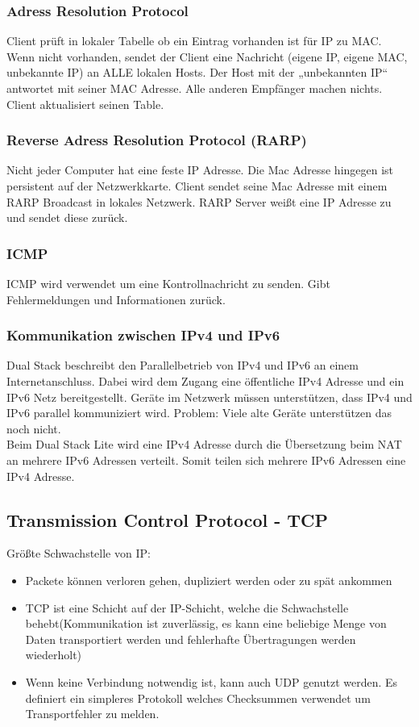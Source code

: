 \documentclass[12pt,a4paper]{article}
\begin{document}
\subsubsection{Adress Resolution Protocol}
Client prüft in lokaler Tabelle ob ein Eintrag vorhanden ist für IP zu MAC. Wenn nicht vorhanden, sendet der Client eine Nachricht (eigene IP, eigene MAC, unbekannte IP) an ALLE lokalen Hosts. Der Host mit der „unbekannten IP“ antwortet mit seiner MAC Adresse. Alle anderen Empfänger machen nichts. Client aktualisiert seinen Table.

\subsubsection{Reverse Adress Resolution Protocol (RARP)}
Nicht jeder Computer hat eine feste IP Adresse. Die Mac Adresse hingegen ist persistent auf der Netzwerkkarte. Client sendet seine Mac Adresse mit einem RARP Broadcast in lokales Netzwerk. RARP Server weißt eine IP Adresse zu und sendet diese zurück.

\subsubsection{ICMP}
ICMP wird verwendet um eine Kontrollnachricht zu senden. Gibt Fehlermeldungen und Informationen zurück.

\subsubsection{Kommunikation zwischen IPv4 und IPv6}
Dual Stack beschreibt den Parallelbetrieb von IPv4 und IPv6 an einem Internetanschluss. Dabei wird dem Zugang eine öffentliche IPv4 Adresse und ein IPv6 Netz bereitgestellt. Geräte im Netzwerk müssen unterstützen, dass IPv4 und IPv6 parallel kommuniziert wird. Problem: Viele alte Geräte unterstützen das noch nicht. \\
Beim Dual Stack Lite wird eine IPv4 Adresse durch die Übersetzung beim NAT an mehrere IPv6 Adressen verteilt. Somit teilen sich mehrere IPv6 Adressen eine IPv4 Adresse.

\subsection{Transmission Control Protocol - TCP}
Größte Schwachstelle von IP:
\begin{itemize}
	\item Packete können verloren gehen, dupliziert werden oder zu spät ankommen
	\item TCP ist eine Schicht auf der IP-Schicht, welche die Schwachstelle behebt(Kommunikation ist zuverlässig, es kann eine beliebige Menge von Daten transportiert werden und fehlerhafte Übertragungen werden wiederholt)
	\item Wenn keine Verbindung notwendig ist, kann auch UDP genutzt werden. Es definiert ein simpleres Protokoll welches Checksummen verwendet um Transportfehler zu melden.
\end{itemize}
\end{document}
